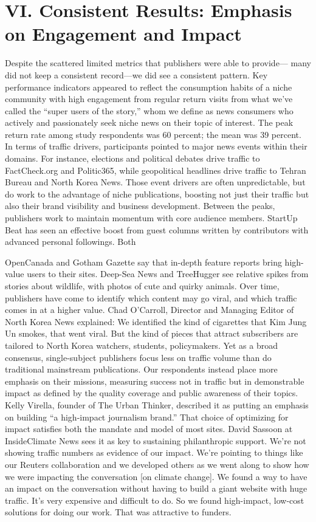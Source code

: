 \chapter{VI. Consistent Results: Emphasis on Engagement and Impact}
Despite the scattered limited metrics that publishers were able to provide—
many did not keep a consistent record—we did see a consistent pattern.
Key performance indicators appeared to reflect the consumption habits of
a niche community with high engagement from regular return visits from
what we’ve called the ``super users of the story,'' whom we define as news
consumers who actively and passionately seek niche news on their topic of
interest. The peak return rate among study respondents was 60 percent; the
mean was 39 percent.
In terms of traffic drivers, participants pointed to major news events within
their domains. For instance, elections and political debates drive traffic to
FactCheck.org and Politic365, while geopolitical headlines drive traffic to
Tehran Bureau and North Korea News. Those event drivers are often unpredictable,
but do work to the advantage of niche publications, boosting not
just their traffic but also their brand visibility and business development.
Between the peaks, publishers work to maintain momentum with core
audience members. StartUp Beat has seen an effective boost from guest
columns written by contributors with advanced personal followings. Both

OpenCanada and Gotham Gazette say that in-depth feature reports bring
high-value users to their sites. Deep-Sea News and TreeHugger see relative
spikes from stories about wildlife, with photos of cute and quirky animals.
Over time, publishers have come to identify which content may go viral,
and which traffic comes in at a higher value. Chad O’Carroll, Director and
Managing Editor of North Korea News explained:
We identified the kind of cigarettes that Kim Jung Un smokes, that
went viral. But the kind of pieces that attract subscribers are tailored
to North Korea watchers, students, policymakers.
Yet as a broad consensus, single-subject publishers focus less on traffic
volume than do traditional mainstream publications. Our respondents
instead place more emphasis on their missions, measuring success not
in traffic but in demonstrable impact as defined by the quality coverage
and public awareness of their topics. Kelly Virella, founder of The Urban
Thinker, described it as putting an emphasis on building ``a high-impact
journalism brand.''
That choice of optimizing for impact satisfies both the mandate and model
of most sites. David Sassoon at InsideClimate News sees it as key to sustaining
philanthropic support.
We’re not showing traffic numbers as evidence of our impact. We’re
pointing to things like our Reuters collaboration and we developed
others as we went along to show how we were impacting the conversation
[on climate change].
We found a way to have an impact on the conversation without having
to build a giant website with huge traffic. It’s very expensive and
difficult to do. So we found high-impact, low-cost solutions for doing
our work. That was attractive to funders.


